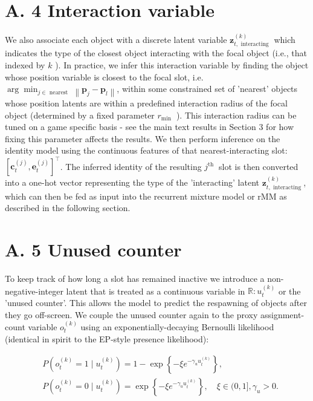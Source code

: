 \documentclass[10pt]{article}
\begin{document}
\section*{A. 4 Interaction variable}
We also associate each object with a discrete latent variable $\mathbf{z}_{t, \text { interacting }}^{(k)}$ which indicates the type of the closest object interacting with the focal object (i.e., that indexed by $k$ ). In practice, we infer this interaction variable by finding the object whose position variable is closest to the focal slot, i.e. $\arg \min _{j \in \text { nearest }}\left\|\mathbf{p}_{j}-\mathbf{p}_{l}\right\|$, within some constrained set of 'nearest' objects whose position latents are within a predefined interaction radius of the focal object (determined by a fixed parameter $r_{\text {min }}$ ). This interaction radius can be tuned on a game specific basis - see the main text results in Section 3 for how fixing this parameter affects the results. We then perform inference on the identity model using the continuous features of that nearest-interacting slot: $\left[\mathbf{c}_{t}^{(j)}, \mathbf{e}_{t}^{(j)}\right]^{\top}$. The inferred identity of the resulting $j^{\text {th }}$ slot is then converted into a one-hot vector representing the type of the 'interacting' latent $\mathbf{z}_{t, \text { interacting }}^{(k)}$, which can then be fed as input into the recurrent mixture model or rMM as described in the following section.

\section*{A. 5 Unused counter}
To keep track of how long a slot has remained inactive we introduce a non-negative-integer latent that is treated as a continuous variable in $\mathbb{R}: u_{t}^{(k)}$ or the 'unused counter'. This allows the model to predict the respawning of objects after they go off-screen. We couple the unused counter again to the proxy assignment-count variable $o_{t}^{(k)}$ using an exponentially-decaying Bernoulli likelihood (identical in spirit to the EP-style presence likelihood):


\begin{align*}
& P\left(o_{t}^{(k)}=1 \mid u_{t}^{(k)}\right)=1-\exp \left\{-\xi e^{-\gamma_{u} u_{t}^{(k)}}\right\}, \\
& P\left(o_{t}^{(k)}=0 \mid u_{t}^{(k)}\right)=\exp \left\{-\xi e^{-\gamma_{u} u_{t}^{(k)}}\right\}, \quad \xi \in(0,1], \gamma_{u}>0 . \tag{22}
\end{align*}
\end{document}
